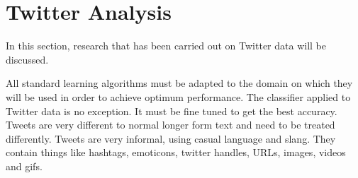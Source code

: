\section{Twitter Analysis}

In this section, research that has been carried out on Twitter data will be discussed.

All standard learning algorithms must be adapted to the domain on which they will be used in order to achieve optimum performance. The classifier applied to Twitter data is no exception. It must be fine tuned to get the best accuracy. Tweets are very different to normal longer form text and need to be treated differently. Tweets are very informal, using casual language and slang. They contain things like hashtags, emoticons, twitter handles, URLs, images, videos and gifs.